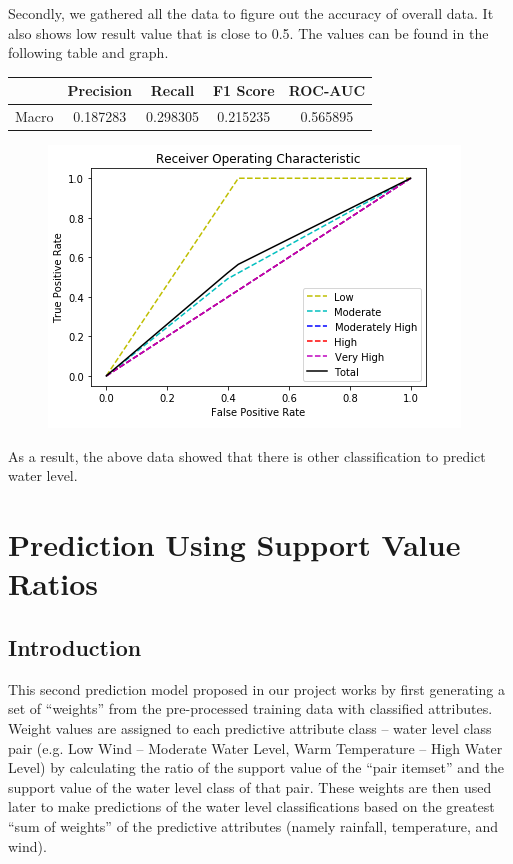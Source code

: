 \documentclass[10pt, conference, compsocconf]{IEEEtran}
\begin{document}
Secondly, we gathered all the data to figure out the accuracy of overall data. It also shows low result value that is close to 0.5. The values can be found in the following table and graph.
\begin{center}
 \begin{tabular}{||c c c c c||} 
 \hline
  & Precision & Recall & F1 Score & ROC-AUC \\ [0.5ex] 
 \hline\hline
 Macro & 0.187283 & 0.298305 & 0.215235 & 0.565895 \\ 
 \hline
\end{tabular}
\end{center}
\clearpage
\begin{figure}[H]
\begin{center}
\includegraphics[width=0.9\linewidth]{vert_ROC.png}
\end{center}
\end{figure}
As a result, the above data showed that there is other classification to predict water level.

\section{Prediction Using Support Value Ratios}

\subsection{Introduction}

This second prediction model proposed in our project works by first generating a set of “weights” from the pre-processed training data with classified attributes. Weight values are assigned to each predictive attribute class – water level class pair (e.g. Low Wind – Moderate Water Level, Warm Temperature – High Water Level) by calculating the ratio of the support value of the “pair itemset” and the support value of the water level class of that pair. These weights are then used later to make predictions of the water level classifications based on the greatest “sum of weights” of the predictive attributes (namely rainfall, temperature, and wind).
\end{document}

